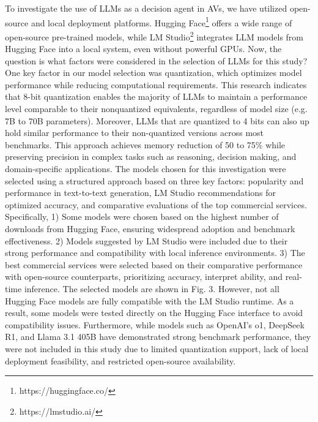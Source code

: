 \documentclass[conference]{IEEEtran}
\begin{document}
To investigate the use of LLMs as a decision agent in AVs, we have utilized open-source and local deployment platforms. Hugging Face\footnote{https://huggingface.co/} offers a wide range of open-source pre-trained models, while LM Studio\footnote{https://lmstudio.ai/} integrates LLM models from Hugging Face into a local system, even without powerful GPUs. Now, the question is what factors were considered in the selection of LLMs for this study? One key factor in our model selection was quantization, which optimizes model performance while reducing computational requirements. This research \cite{xiao2023smoothquant} indicates that 8-bit quantization enables the majority of LLMs to maintain a performance level comparable to their nonquantized equivalents, regardless of model size (e.g. 7B to 70B parameters). Moreover, LLMs that are quantized to 4 bits can also up hold similar performance to their non-quantized versions across most benchmarks. This approach achieves memory reduction of 50 to 75\% while preserving precision in complex tasks such as reasoning, decision making, and domain-specific applications. 
The models chosen for this investigation were selected using a structured approach based on three key factors: popularity and performance in text-to-text generation, LM Studio recommendations for optimized accuracy, and comparative evaluations of the top commercial services. Specifically, 1) Some models were chosen based on the highest number of downloads from Hugging Face, ensuring widespread adoption and benchmark effectiveness. 2) Models suggested by LM Studio were included due to their strong performance and compatibility with local inference environments. 3) The best commercial services were selected based on their comparative performance with open-source counterparts, prioritizing accuracy, interpret ability, and real-time inference. The selected models are shown in Fig. 3. However, not all Hugging Face models are fully compatible with the LM Studio runtime. As a result, some models were tested directly on the Hugging Face interface to avoid compatibility issues. Furthermore, while models such as OpenAI’s o1, DeepSeek R1, and Llama 3.1 405B have demonstrated strong benchmark performance, they were not included in this study due to limited quantization support, lack of local deployment feasibility, and restricted open-source availability.

\end{document}
